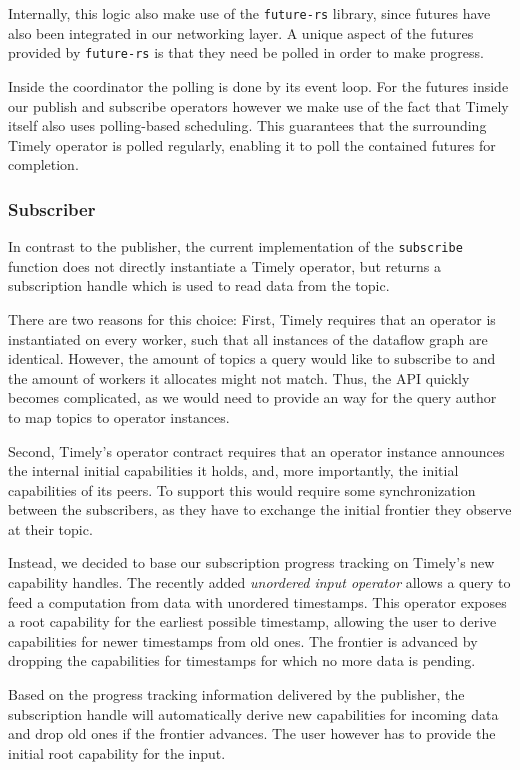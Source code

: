 Internally, this logic also make use of the \lstinline{future-rs} library, 
since futures have also been integrated in our networking layer. A unique
aspect of the futures provided by \lstinline{future-rs} is that they need
be polled in order to make progress.

Inside the coordinator the polling is done by its event loop. For the futures
inside our publish and subscribe operators however we make use of the fact
that Timely itself also uses polling-based scheduling. This guarantees that
the surrounding Timely operator is polled regularly, enabling it to poll
the contained futures for completion.

\subsubsection{Subscriber}

In contrast to the publisher, the current implementation of the \lstinline{subscribe}
function does not directly instantiate a Timely operator, but returns a subscription
handle which is used to read data from the topic.

There are two reasons for this choice: First, Timely requires that an operator
is instantiated on every worker, such that all instances of the dataflow graph
are identical. However, the amount of topics a query would like to subscribe
to and the amount of workers it allocates might not match. Thus, the API
quickly becomes complicated, as we would need to provide an way for the 
query author to map topics to operator instances.

Second, Timely's operator contract requires that an operator instance announces
the internal initial capabilities it holds, and, more importantly, the initial
capabilities of its peers. To support this would require some synchronization
between the subscribers, as they have to exchange the initial frontier they
observe at their topic.

Instead, we decided to base our subscription progress tracking on Timely's new
capability handles. The recently added \emph{unordered input operator} allows
a query to feed a computation from data with unordered timestamps. This operator
exposes a root capability for the earliest possible timestamp, allowing the user
to derive capabilities for newer timestamps from old ones. The frontier
is advanced by dropping the capabilities for timestamps for which no more data
is pending.

Based on the progress tracking information delivered by the publisher, the
subscription handle will automatically derive new capabilities for incoming
data and drop old ones if the frontier advances. The user however has to
provide the initial root capability for the input.

